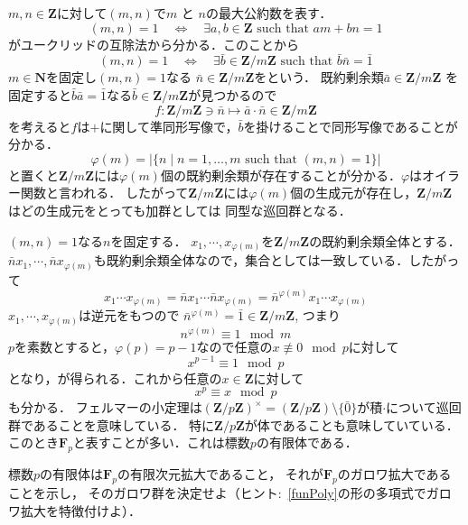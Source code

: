 

$m, n\in \mathbf Z$に対して$(m,n)$で$m$ と $n$の最大公約数を表す．
\[
     (m,n)=1
     \quad \Leftrightarrow\quad
     \exists a, b\in \mathbf Z \text{ such that } am + bn =1
\]
がユークリッドの互除法から分かる．このことから
\[
     (m,n)=1
     \quad \Leftrightarrow\quad
     \exists  \bar b\in \mathbf Z/m\mathbf Z \text{ such that } 
           \bar b\bar n= \bar 1
\]
$m\in \mathbf N$を固定し$(m,n)=1$なる
$\bar n\in\mathbf Z/m\mathbf Z$をという．
既約剰余類$\bar a\in \mathbf Z/m\mathbf Z$ を固定すると$\bar b\bar a = \bar 1$なる$\bar b\in \mathbf Z/m\mathbf Z$が見つかるので
\[
     f:\mathbf Z/m\mathbf Z\ni \bar n 
      \mapsto \bar{a}\cdot\bar{n}\in  \mathbf Z/m\mathbf Z
\]
を考えると$f$は$+$に関して準同形写像で，$\bar b$を掛けることで同形写像であることが分かる．
\[
     \varphi(m)= |\{n\mid n=1,\dots, m \text{ such that } (m,n)=1\}|
\]
と置くと$\mathbf Z/m\mathbf Z$には$\varphi(m)$個の既約剰余類が存在することが分かる．$\varphi$はオイラー関数と言われる．
したがって$\mathbf Z/m\mathbf Z$には$\varphi(m)$個の生成元が存在し，$\mathbf Z/m\mathbf Z$はどの生成元をとっても加群としては
同型な巡回群となる．

$(m,n)=1$なる$n$を固定する．
$x_1, \cdots, x_{\varphi(m)}$を$\mathbf Z/m\mathbf Z$の既約剰余類全体とする．$\bar n x_1, \cdots , \bar nx_{\varphi(m)}$も既約剰余類全体なので，集合としては一致している．したがって
\[
     x_1\cdots x_{\varphi(m)}=\bar n x_1 \cdots \bar n x_{\varphi(m)}
     =\bar n^{\varphi(m)}x_1\cdots x_{\varphi(m)}
\]
$x_1, \cdots , x_{\varphi(m)}$は逆元をもつので
$
     \bar n^{\varphi(m)}=\bar 1\in\mathbf Z/m\mathbf Z
$,  つまり
\[
     n^{\varphi(m)}\equiv 1 \mod m
\]
$p$を素数とすると，$\varphi(p)=p-1$なので任意の$x\not\equiv 0 \mod p$に対して
\[
     x^{p-1}\equiv 1 \mod p
\]
となり，が得られる．これから任意の$x\in \mathbf Z$に対して
\begin{equation}\label{funPoly}
     x^{p}\equiv x \mod p
\end{equation}
も分かる．
フェルマーの小定理は$(\mathbf Z/p\mathbf Z)^{\times}=(\mathbf Z/p\mathbf Z)\setminus \{\bar 0\}$が積$\cdot$について巡回群であることを意味している．
特に$\mathbf Z/p\mathbf Z$が体であることも意味していている．
このとき$\mathbf F_p$と表すことが多い．これは標数$p$の有限体である．

\begin{Quiz}
   標数$p$の有限体は$\mathbf F_p$の有限次元拡大であること，
   それが$\mathbf F_p$のガロワ拡大であることを示し，
   そのガロワ群を決定せよ（ヒント$:$
    \eqref{funPoly}の形の多項式でガロワ拡大を特徴付けよ）．
\end{Quiz}



